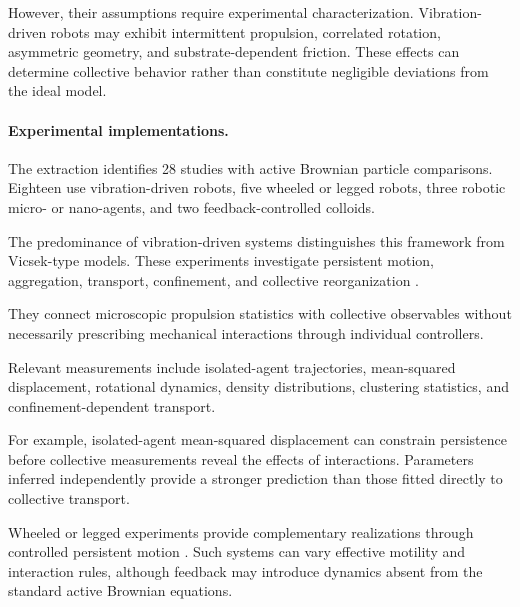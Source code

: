 However, their assumptions require
experimental characterization.
Vibration-driven robots may exhibit
intermittent propulsion, correlated
rotation, asymmetric geometry,
and substrate-dependent friction.
These effects can determine
collective behavior rather than
constitute negligible deviations
from the ideal model.

\paragraph*{Experimental implementations.}

The extraction identifies 28 studies
with active Brownian particle comparisons.
Eighteen use vibration-driven robots,
five wheeled or legged robots,
three robotic micro- or nano-agents,
and two feedback-controlled colloids.

The predominance of vibration-driven
systems distinguishes this framework
from Vicsek-type models.
These experiments investigate
persistent motion, aggregation,
transport, confinement, and
collective reorganization
\cite{Welch2018aggregatesuppressio,Balda2022playingwithactive,Fersula2026aggregatingswarmst,Edwards2026robusttopologically,Musacchio2026activeembracemente,Hoek2026pistonlikeinformat,Arbel2025amechanicalroutef,Fersula2026leveragingdesignfo,MuozObreque2026dynamicsofmagnetic,Musacchio2026fluidizationinduced,Callegari2023playingwithactive,Balda2024playingwithactive,Li2021programmingactivec,Siebers2023exploitingcompositi,Son2024emergentfunctional,Zion2023morphologicalcomput,Wagner2026geometryinducedtra,Zion2021distributedonline}.

They connect microscopic propulsion
statistics with collective observables
without necessarily prescribing
mechanical interactions through
individual controllers.

Relevant measurements include
isolated-agent trajectories,
mean-squared displacement,
rotational dynamics,
density distributions,
clustering statistics,
and confinement-dependent
transport.

For example, isolated-agent
mean-squared displacement can
constrain persistence before
collective measurements reveal
the effects of interactions.
Parameters inferred independently
provide a stronger prediction
than those fitted directly
to collective transport.

Wheeled or legged experiments
provide complementary realizations
through controlled persistent motion
\cite{Paramanick2025spontaneousemergenc,Barone2024experimentalandnum,Mijalkov2016engineeringsensoria,Mayya2019nonuniformrobotde,Hao2022controllingcollisio}.
Such systems can vary effective
motility and interaction rules,
although feedback may introduce
dynamics absent from the standard
active Brownian equations.

